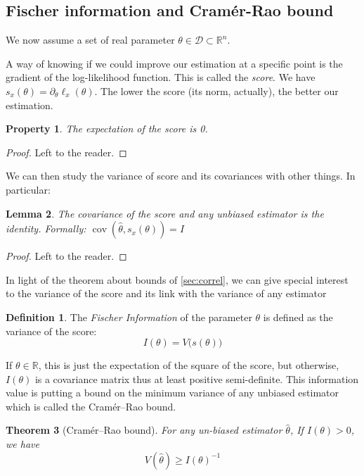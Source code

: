 \documentclass[10pt,a4paper]{report}
\theoremstyle{plain}
\newtheorem{thm}{Theorem}[chapter]
\newtheorem{prop}[thm]{Property}
\newtheorem{lem}[thm]{Lemma}
\theoremstyle{definition}
\newtheorem{defn}{Definition}[chapter]
\theoremstyle{remark}
\newcommand{\R}{\ensuremath{\mathbb{R}}}
\newcommand{\TODO}{\textbf{TODO}}
\DeclareMathOperator{\cov}{cov}
\begin{document}
\subsection{Fischer information and Cramér-Rao bound}

We now assume a set of real parameter $\theta \in \mathcal{D} \subset \R^n$.

A way of knowing if we could improve our estimation at a specific point is the
gradient of the log-likelihood function. This is called the
\emph{score}. We have $s_x(\theta) = \partial_\theta \ell_x(\theta)$. The
lower the score (its norm, actually), the better our estimation.

\begin{prop} The expectation of the score is 0.
\end{prop}
\begin{proof}
  Left to the reader.
\end{proof}

We can then study the variance of score and its covariances with other things.
In particular:

\begin{lem}\label{lem:corscr}
  The covariance of the score and any unbiased estimator is the identity.
  Formally: $\cov(\hat \theta, s_x(\theta)) = I$
\end{lem}

\begin{proof}
  Left to the reader.
\end{proof}

In light of the theorem about bounds of \cref{sec:correl}, we can give special
interest to the variance of the score and its link with the variance of any estimator

\begin{defn} The \emph{Fischer Information} of the parameter $\theta$ is defined
  as the variance of the score:
  \[I(\theta) = V\big(s(\theta)\big)\]
\end{defn}

If $\theta \in \R$, this is just the expectation of the square of the score, but
otherwise, $I(\theta)$ is a covariance matrix thus at least positive
semi-definite.
This information value is putting a bound on the minimum variance of any
unbiased estimator which is called the Cramér–Rao bound.

\begin{thm}[Cramér–Rao bound]
  For any un-biased estimator $\hat \theta$, If $I(\theta) > 0$, we have
  \[V(\hat{\theta}) \ge {I(\theta)}^{-1}\]
\end{thm}
\end{document}
